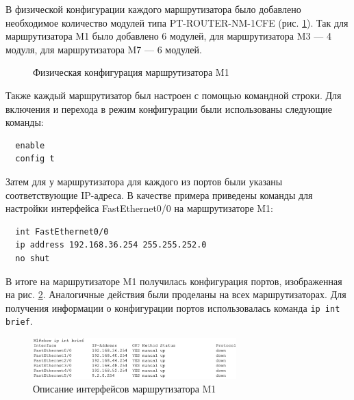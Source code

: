 \documentclass[a4paper, 14pt]{extarticle}
\begin{document}
В физической конфигурации каждого маршрутизатора было добавлено необходимое
количество модулей типа PT-ROUTER-NM-1CFE (рис. \ref{fig:network-2.png}). Так
для маршрутизатора M1 было добавлено 6 модулей, для маршрутизатора M3 — 4
модуля, для маршрутизатора M7 — 6 модулей.

\begin{figure}[H]
  \centering
  \caption{Физическая конфигурация маршрутизатора M1}
  \label{fig:network-2.png}
\end{figure}

Также каждый маршрутизатор был настроен с помощью командной строки. Для
включения и перехода в режим конфигурации были использованы следующие команды:
\begin{verbatim}
  enable
  config t
\end{verbatim}
Затем для у маршрутизатора для каждого из портов были указаны соответствующие
IP-адреса. В качестве примера приведены команды для настройки интерфейса
FastEthernet0/0 на маршрутизаторе M1:
\begin{verbatim}
  int FastEthernet0/0
  ip address 192.168.36.254 255.255.252.0
  no shut
\end{verbatim}
В итоге на маршрутизаторе M1 получилась конфигурация портов, изображенная на
рис. \ref{fig:int-brief/m1.png}. Аналогичные действия были проделаны на всех
маршрутизаторах. Для получения информации о конфигурации портов использовалась
команда \texttt{ip int brief}.

\begin{figure}[H]
  \centering
  \includegraphics[width=0.7\textwidth]{images/int-brief/m1.png}
  \caption{Описание интерфейсов маршрутизатора M1}
  \label{fig:int-brief/m1.png}
\end{figure}
\end{document}
